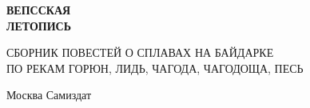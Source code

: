 \begin{titlepage}
	\newpage
	\begin{center}
		\huge \textbf \MyVarAuthorName
	\end{center}	
	\vspace{2.8cm}	
	
	\uzor
	
	\begin{center}
		\Huge \textbf {ВЕПССКАЯ\\ЛЕТОПИСЬ}
	\end{center}	
	\vspace{0.0cm}

	\uzor

	\begin{center}
		\small {СБОРНИК ПОВЕСТЕЙ О СПЛАВАХ НА БАЙДАРКЕ\\ПО РЕКАМ ГОРЮН, ЛИДЬ, ЧАГОДА, ЧАГОДОЩА, ПЕСЬ}
	\end{center}

	\uzor
		
	\vspace{\fill}	
	\begin{center}
		\normalsize
		Москва  \linebreak
		Самиздат
	\end{center}	
\end{titlepage}